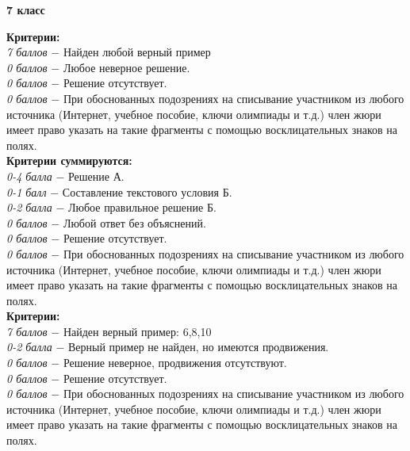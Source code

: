 \centerline{\bf \Huge 7 класс}

 \textbf{Критерии:} \\
\textit{7 баллов} $-$ Найден любой верный пример\\
\textit{0 баллов} $-$ Любое неверное решение.\\
\textit{0 баллов} $-$ Решение отсутствует.\\
\textit{0 баллов} $-$ При обоснованных подозрениях на списывание участником из любого источника (Интернет, учебное пособие, ключи олимпиады и т.д.) член жюри имеет право указать на такие фрагменты с помощью восклицательных знаков на полях. \\

 \textbf{Критерии суммируются:} \\
\textit{0-4 балла} $-$ Решение А.\\
\textit{0-1 балл} $-$ Составление текстового условия Б.\\
\textit{0-2 балла} $-$ Любое правильное решение Б.\\
\textit{0 баллов} $-$ Любой ответ без объяснений.\\
\textit{0 баллов} $-$ Решение отсутствует.\\
\textit{0 баллов} $-$ При обоснованных подозрениях на списывание участником из любого источника (Интернет, учебное пособие, ключи олимпиады и т.д.) член жюри имеет право указать на такие фрагменты с помощью восклицательных знаков на полях. \\


 \textbf{Критерии:} \\
\textit{7 баллов} $-$ Найден верный пример: 6,8,10\\
\textit{0-2 балла} $-$ Верный пример не найден, но имеются продвижения.\\
\textit{0 баллов} $-$ Решение неверное, продвижения отсутствуют.\\
\textit{0 баллов} $-$ Решение отсутствует.\\
\textit{0 баллов} $-$ При обоснованных подозрениях на списывание участником из любого источника (Интернет, учебное пособие, ключи олимпиады и т.д.) член жюри имеет право указать на такие фрагменты с помощью восклицательных знаков на полях. \\

\newpage


